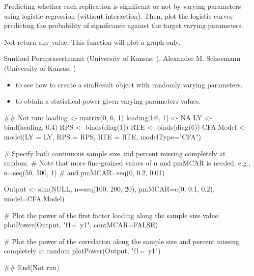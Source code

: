 \documentclass[a4paper]{book}
\begin{document}
%
\begin{Details}\relax
Predicting whether each replication is significant or not by varying parameters using logistic regression (without interaction). Then, plot the logistic curves predicting the probability of significance against the target varying parameters.
\end{Details}
%
\begin{Value}
Not return any value. This function will plot a graph only.
\end{Value}
%
\begin{Author}\relax
Sunthud Pornprasertmanit (University of Kansas; ), Alexander M. Schoemann (University of Kansas; )
\end{Author}
%
\begin{SeeAlso}\relax
\begin{itemize}

\item {} to see how to create a simResult object with randomly varying parameters.
\item {} to obtain a statistical power given varying parameters values.

\end{itemize}

\end{SeeAlso}
%
\begin{Examples}
\begin{ExampleCode}
## Not run: 
loading <- matrix(0, 6, 1)
loading[1:6, 1] <- NA
LY <- bind(loading, 0.4)
RPS <- binds(diag(1))
RTE <- binds(diag(6))
CFA.Model <- model(LY = LY, RPS = RPS, RTE = RTE, modelType="CFA")

# Specify both continuous sample size and percent missing completely at random. 
# Note that more fine-grained values of n and pmMCAR is needed, e.g., n=seq(50, 500, 1) 
# and pmMCAR=seq(0, 0.2, 0.01)

Output <- sim(NULL, n=seq(100, 200, 20), pmMCAR=c(0, 0.1, 0.2), model=CFA.Model)

# Plot the power of the first factor loading along the sample size value
plotPower(Output, "f1=~y1", contMCAR=FALSE)

# Plot the power of the correlation along the sample size and percent missing completely at random
plotPower(Output, "f1=~y1")

## End(Not run)
\end{ExampleCode}
\end{Examples}
\end{document}
